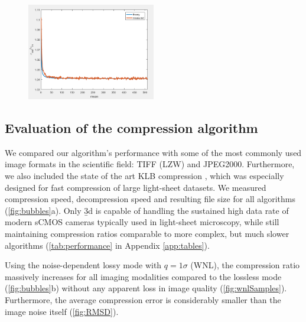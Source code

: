     \begin{figure}
      \centering
      \includegraphics[width=0.5\textwidth]{extraNoise}
      \label{fig:extraNoise}
    \end{figure}

  \subsection{Evaluation of the compression algorithm}
    \label{sec:evalB3D}
  We compared our algorithm’s performance with some of the most commonly used image formats in the scientific field: TIFF (LZW) and JPEG2000. Furthermore, we also included the state of the art KLB compression \cite{amat_efficient_2015}, which was especially designed for fast compression of large light-sheet datasets. We measured compression speed, decompression speed and resulting file size for all algorithms (\autoref{fig:bubbles}a). Only \b3d is capable of handling the sustained high data rate of modern sCMOS cameras typically used in light-sheet microscopy, while still maintaining compression ratios comparable to more complex, but much slower algorithms (\autoref{tab:performance} in Appendix \ref{app:tables}).

  Using the noise-dependent lossy mode with $q=1\sigma$ (WNL), the compression ratio massively increases for all imaging modalities compared to the lossless mode (\autoref{fig:bubbles}b) without any apparent loss in image quality (\autoref{fig:wnlSamples}). Furthermore, the average compression error is considerably smaller than the image noise itself (\autoref{fig:RMSD}).

